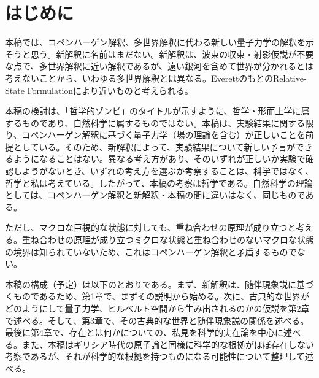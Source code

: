 \section*{はじめに}
本稿では、コペンハーゲン解釈、多世界解釈に代わる新しい量子力学の解釈を示そうと思う。新解釈に名前はまだない。新解釈は、波束の収束・射影仮説が不要な点で、多世界解釈に近い解釈であるが、遠い銀河を含めて世界が分かれるとは考えないことから、いわゆる多世界解釈とは異なる。EverettのもとのRelative-State Formulationにより近いものと考えられる。\par
本稿の検討は、「哲学的ゾンビ」のタイトルが示すように、哲学・形而上学に属するものであり、自然科学に属するものではない。本稿は、実験結果に関する限り、コペンハーゲン解釈に基づく量子力学（場の理論を含む）が正しいことを前提としている。そのため、新解釈によって、実験結果について新しい予言ができるようになることはない。異なる考え方があり、そのいずれが正しいか実験で確認しようがないとき、いずれの考え方を選ぶか考察することは、科学ではなく、哲学と私は考えている。したがって、本稿の考察は哲学である。自然科学の理論としては、コペンハーゲン解釈と新解釈・本稿の間に違いはなく、同じものである。\par
ただし、マクロな巨視的な状態に対しても、重ね合わせの原理が成り立つと考える。重ね合わせの原理が成り立つミクロな状態と重ね合わせのないマクロな状態の境界は知られていないため、これはコペンハーゲン解釈と矛盾するものでない。\par
本稿の構成（予定）は以下のとおりである。まず、新解釈は、随伴現象説に基づくものであるため、第1章で、まずその説明から始める。次に、古典的な世界がどのようにして量子力学、ヒルベルト空間から生み出されるのかの仮説を第2章で述べる。そして、第3章で、その古典的な世界と随伴現象説の関係を述べる。最後に第4章で、存在とは何かについての、私見を科学的実在論を中心に述べる。また、本稿はギリシア時代の原子論と同様に科学的な根拠がほぼ存在しない考察であるが、それが科学的な根拠を持つものになる可能性について整理して述べる。